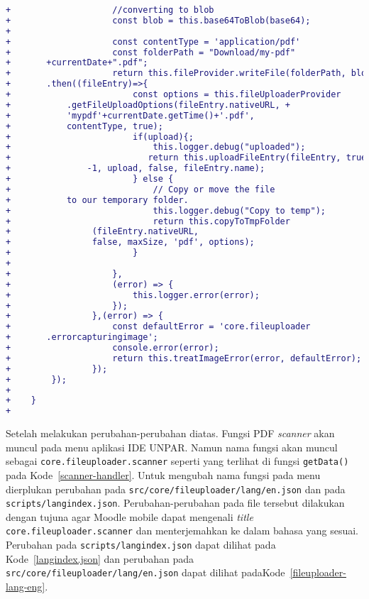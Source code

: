 \begin{lstlisting}[language=diff, frame=single, label ={fileuploader-helper}, caption = Perubahan pada \texttt{src/core/fileuploader/providers/helper.ts} ]
+                    //converting to blob
+                    const blob = this.base64ToBlob(base64);
+                    
+                    const contentType = 'application/pdf'
+                    const folderPath = "Download/my-pdf"
+ 		+currentDate+".pdf";
+                    return this.fileProvider.writeFile(folderPath, blob)
+		.then((fileEntry)=>{
+                        const options = this.fileUploaderProvider
+			.getFileUploadOptions(fileEntry.nativeURL, +	
+			'mypdf'+currentDate.getTime()+'.pdf',  
+			contentType, true);
+                        if(upload){;
+                            this.logger.debug("uploaded");
+                           return this.uploadFileEntry(fileEntry, true, 
+ 		        -1, upload, false, fileEntry.name);
+                        } else {
+                            // Copy or move the file 
+			to our temporary folder.
+                            this.logger.debug("Copy to temp");
+                            return this.copyToTmpFolder
+ 		         (fileEntry.nativeURL, 
+ 		         false, maxSize, 'pdf', options);
+                        }
+                    
+                    },
+                    (error) => {
+                        this.logger.error(error);
+                    });
+                },(error) => {
+                    const defaultError = 'core.fileuploader
+		.errorcapturingimage';
+                    console.error(error);
+                    return this.treatImageError(error, defaultError);
+                });
+        });
+    
+    }
+
\end{lstlisting}

Setelah melakukan perubahan-perubahan diatas. Fungsi PDF \textit{scanner} akan muncul pada menu aplikasi IDE UNPAR. Namun nama fungsi akan muncul sebagai \texttt{core.fileuploader.scanner} seperti yang terlihat di fungsi \texttt{getData()} pada \mbox{Kode \ref{scanner-handler}}. Untuk mengubah nama fungsi pada menu dierplukan perubahan pada \texttt{src/core/fileuploader/lang/en.json} dan pada \texttt{scripts/langindex.json}. Perubahan-perubahan pada file tersebut dilakukan dengan tujuna agar Moodle mobile dapat mengenali \textit{title} \texttt{core.fileuploader.scanner} dan menterjemahkan ke dalam bahasa yang sesuai.  Perubahan pada \texttt{scripts/langindex.json} dapat dilihat pada \mbox{Kode \ref{langindex.json}} dan perubahan pada \texttt{src/core/fileuploader/lang/en.json} dapat dilihat pada\mbox{Kode \ref{fileuploader-lang-eng}}.

